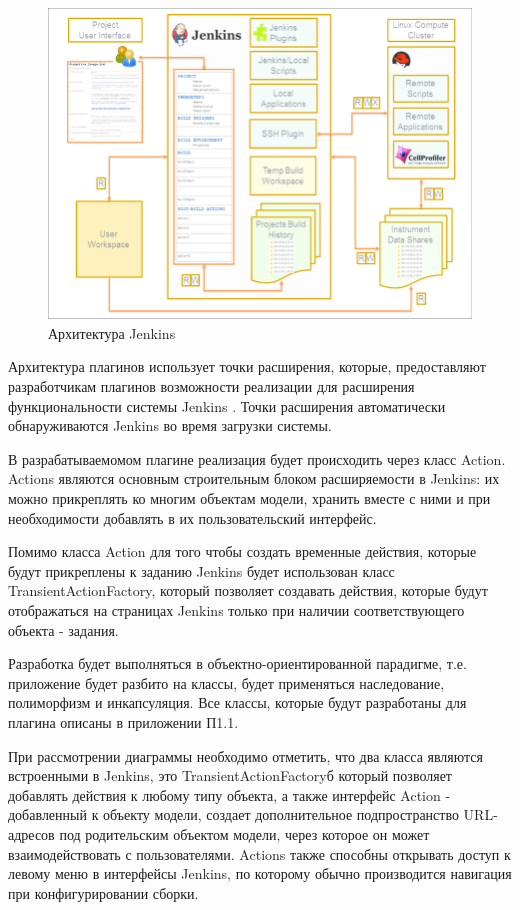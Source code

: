\begin{figure}[ht!] 
	\center
	\includegraphics [scale=0.47] {my_folder/images//ArchitectureJenkins}
	\caption{Архитектура Jenkins \cite{article}} 
	\label{fig:ArchitectureJenkins}  
\end{figure}


Архитектура плагинов использует точки расширения, которые, предоставляют разработчикам плагинов возможности реализации для расширения функциональности системы Jenkins \cite{atchplugin}. Точки расширения автоматически обнаруживаются Jenkins во время загрузки системы.

В разрабатываемомом плагине реализация будет происходить через класс Action. Actions являются основным строительным блоком расширяемости в Jenkins: их можно прикреплять ко многим объектам модели, хранить вместе с ними и при необходимости добавлять в их пользовательский интерфейс.

Помимо класса Action для того чтобы создать временные действия, которые будут прикреплены к заданию Jenkins будет использован класс TransientActionFactory, который позволяет создавать действия, которые будут отображаться на страницах Jenkins только при наличии соответствующего объекта - задания.

Разработка будет выполняться в объектно-ориентированной парадигме, т.е. приложение будет разбито на классы, будет применяться наследование, полиморфизм и инкапсуляция. Все классы, которые будут разработаны для плагина описаны в приложении П1.1. 

При рассмотрении диаграммы необходимо отметить, что два класса являются встроенными в Jenkins, это TransientActionFactoryб который позволяет добавлять действия к любому типу объекта, а также интерфейс Action - добавленный к объекту модели, создает дополнительное подпространство URL-адресов под родительским объектом модели, через которое он может взаимодействовать с пользователями. Actions также способны открывать доступ к левому меню в интерфейсы Jenkins, по которому обычно производится навигация при конфигурировании сборки.

